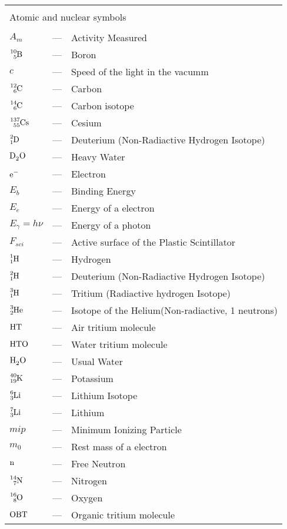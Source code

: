 \begin{longtable}{p{25mm} c p{120mm} }
\\
\\
\multicolumn{3}{l}{Atomic and nuclear symbols}\\
\\
$A_{m}$ & --- & Activity Measured\\
$\ce{^{10}_{5}B}$ & --- & Boron\\
$c$ & --- & Speed of the light in the vacumm\\
$\ce{^{12}_{6}C}$ & --- & Carbon\\
$\ce{^{14}_{6}C}$ & --- & Carbon isotope\\
$\ce{^{137}_{55}Cs}$ & --- & Cesium\\
$\ce{^{2}_{1}D}$ & --- & Deuterium (Non-Radiactive Hydrogen Isotope)\\
$\ce{D_{2}O}$ & --- & Heavy Water\\
$\ce{e^-}$ & --- & Electron\\
$E_b$ & --- & Binding Energy\\
$E_e$ & --- & Energy of a electron\\
$E_\gamma = h\nu$ & --- & Energy of a photon\\
$F_{sci}$ & --- & Active surface of the Plastic Scintillator\\
$\ce{^{1}_{1}H}$ & --- & Hydrogen\\
$\ce{^{2}_{1}H}$ & --- & Deuterium (Non-Radiactive Hydrogen Isotope)\\
$\ce{^{3}_{1}H}$ & --- & Tritium (Radiactive hydrogen Isotope)\\
$\ce{^{3}_{2}He}$ & --- & Isotope of the Helium(Non-radiactive, 1 neutrons)\\
$\ce{HT}$ & --- & Air tritium molecule\\
$\ce{HTO}$ & --- & Water tritium molecule\\
$\ce{H_{2}O}$ & --- & Usual Water\\
$\ce{^{40}_{19}K}$ & --- & Potassium\\
$\ce{^{6}_{3}Li}$ & --- & Lithium Isotope\\
$\ce{^{7}_{3}Li}$ & --- & Lithium\\
$mip$ & --- & Minimum Ionizing Particle\\
$m_0$ & --- & Rest mass of a electron\\
$\ce{n}$ & --- & Free Neutron\\
$\ce{^{14}_{7}N}$ & --- & Nitrogen\\
$\ce{^{16}_{8}O}$ & --- & Oxygen\\
$\ce{OBT}$ & --- & Organic tritium molecule\\

\end{longtable}
